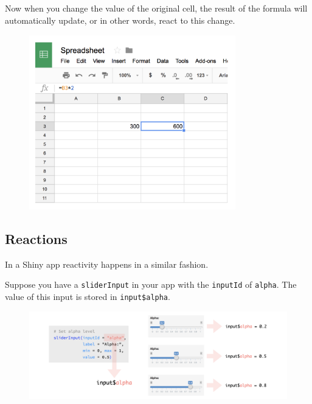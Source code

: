 \documentclass[
  letterpaper,
  DIV=11,
  numbers=noendperiod]{scrreprt}
\begin{document}
\hypertarget{section-14}{%
\subsection{}\label{section-14}}

Now when you change the value of the original cell, the result of the
formula will automatically update, or in other words, react to this
change.

\begin{figure}

{\centering \includegraphics[width=0.8\textwidth,height=\textheight]{./images/spreadsheet-5.png}

}

\end{figure}

\hypertarget{reactions}{%
\subsection{Reactions}\label{reactions}}

In a Shiny app reactivity happens in a similar fashion.

Suppose you have a \texttt{sliderInput} in your app with the
\texttt{inputId} of \texttt{alpha}. The value of this input is stored in
\texttt{input\$alpha}.

\begin{figure}

{\centering \includegraphics[width=1\textwidth,height=\textheight]{./images/slider-alpha.png}

}

\end{figure}
\end{document}
